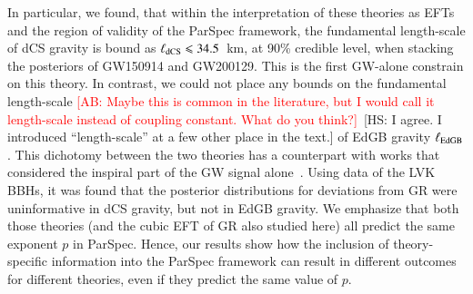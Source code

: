 \documentclass[twocolumn,
               prd,
               aps,
               superscriptaddress,
               tightenlines,
               nofootinbib,
               eqsecnum,
               amsfonts,
               amsmath,
               longbibliography]{revtex4-1}
\newcommand{\hs}[1]{{\textcolor{TealBlue}{{#1}}}}
\newcommand{\hscomm}[1]{{\textcolor{TealBlue}{{[HS: #1]}}}}
\newcommand{\abcomm}[1]{{\textcolor{red}{{[AB: #1]}}}}
\begin{document}
In particular, we found, that within the interpretation of these theories as EFTs and the
region of validity of the ParSpec framework, the fundamental length-scale of dCS gravity is bound as
$\ell_{\rm dCS} \leqslant 34.5$~km, at 90\% credible level, when stacking the posteriors
of GW150914 and GW200129. This is the first GW-alone constrain on this theory.
%
In contrast, we could not place any bounds on the \hs{fundamental} length-scale \abcomm{Maybe
this is common in the literature, but I would call it length-scale instead of coupling
constant. What do you think?}~\hscomm{I agree. I introduced ``length-scale'' at a few other place in the text.} of EdGB gravity $\ell_{\rm EdGB}$.
%
This dichotomy between the two theories has a counterpart with works that considered
the inspiral part of the GW signal alone~\cite{Nair:2019iur,Perkins:2021mhb,Lyu:2022gdr}.
%
Using data of the LVK BBHs, it was found that the posterior distributions for
deviations from GR were uninformative in dCS gravity, but not in EdGB gravity.
We emphasize that both those theories (and the cubic EFT of GR also studied here) all predict the same exponent $p$ in ParSpec.
%
Hence, our results show how the inclusion of theory-specific information into the ParSpec framework
can result in different outcomes for different theories, even if they predict the same value of $p$.

\end{document}
